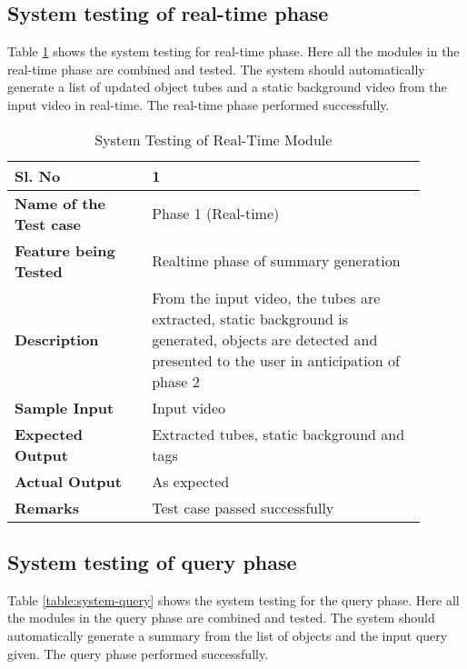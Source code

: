     \subsection{System testing of real-time phase}

    Table \ref{table:system-realtime} shows the system testing for real-time
    phase. Here all the modules in the real-time phase are combined and tested.
    The system should automatically generate a list of updated object tubes and
    a static background video from the input video in real-time. The real-time
    phase performed successfully.

    \FloatBarrier
    \begin{table}[H]
        \caption{System Testing of Real-Time Module}
        \begin{tabular}{|p{0.3\linewidth}|p{0.6\linewidth}|}
            \hline
            \textbf{Sl. No }              &\textbf{ 1}\\
            \hline
            \textbf{Name of the Test case}& Phase 1 (Real-time) \\
            \hline
            \textbf{Feature being Tested}  & Realtime phase of summary generation \\
            \hline
            \textbf{Description}           & From the input video, the tubes
            are extracted, static background is generated, objects are detected
            and presented to the user in anticipation of phase 2 \\
            \hline
            \textbf{Sample Input}          & Input video \\
            \hline
            \textbf{Expected Output}       & Extracted tubes, static background and tags \\
            \hline
            \textbf{Actual Output}         & As expected \\
            \hline
            \textbf{Remarks }              & Test case passed successfully \\
            \hline
        \end{tabular}
        \label{table:system-realtime}
    \end{table}


    \subsection{System testing of query phase}

    Table \ref{table:system-query} shows the system testing for the query
    phase. Here all the modules in the query phase are combined and tested. The
    system should automatically generate a summary from the list of objects and
    the input query given. The query phase performed successfully.

